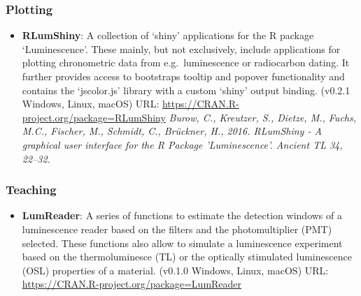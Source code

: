 \documentclass[]{article}
\providecommand{\tightlist}{%
  \setlength{\itemsep}{0pt}\setlength{\parskip}{0pt}}
\begin{document}
\hypertarget{plotting}{%
\subsubsection{Plotting}\label{plotting}}

\begin{itemize}
\tightlist
\item
  \textbf{RLumShiny}: A collection of `shiny' applications for the R package
  `Luminescence'. These mainly, but not exclusively, include applications for
  plotting chronometric data from e.g.~luminescence or radiocarbon dating. It
  further provides access to bootstraps tooltip and popover functionality and
  contains the `jscolor.js' library with a custom `shiny' output binding.
  (v0.2.1 \textbar{} Windows, Linux, macOS)
  URL: \url{https://CRAN.R-project.org/package=RLumShiny}
  \emph{Burow, C., Kreutzer, S., Dietze, M., Fuchs, M.C., Fischer, M., Schmidt, C., Brückner, H., 2016. RLumShiny - A graphical user interface for the R Package 'Luminescence'. Ancient TL 34, 22--32.}
\end{itemize}

\hypertarget{teaching}{%
\subsubsection{Teaching}\label{teaching}}

\begin{itemize}
\tightlist
\item
  \textbf{LumReader}: A series of functions to estimate the detection windows of a luminescence reader based on the filters and the photomultiplier (PMT) selected. These functions also allow to simulate a luminescence experiment based on the thermoluminesce (TL) or the optically stimulated luminescence (OSL) properties of a material.
  (v0.1.0 \textbar{} Windows, Linux, macOS)
  URL: \url{https://CRAN.R-project.org/package=LumReader}
\end{itemize}
\end{document}
